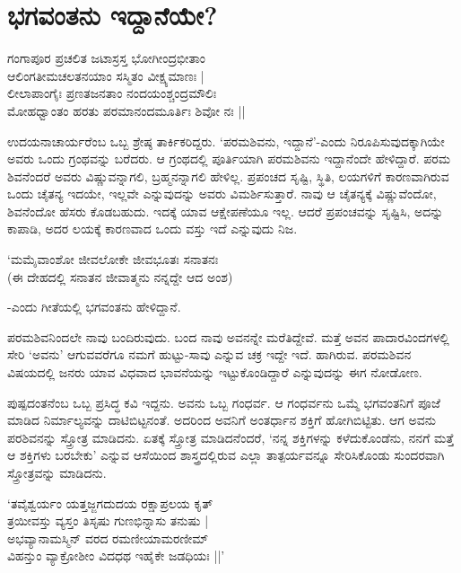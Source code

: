 \chapter{ಭಗವಂತನು ಇದ್ದಾನೆಯೇ?}\label{chap8}

\begin{shloka}
ಗಂಗಾಪೂರ ಪ್ರಚಲಿತ ಜಟಾಸ್ರಸ್ತ ಭೋಗೀಂದ್ರಭೀತಾಂ\\
ಆಲಿಂಗತೀಮಚಲತನಯಾಂ ಸಸ್ಮಿತಂ ವೀಕ್ಷ್ಯಮಾಣಃ |\\
ಲೀಲಾಪಾಂಗೈಃ ಪ್ರಣತಜನತಾಂ ನಂದಯಂಶ್ಚಂದ್ರಮೌಲಿಃ\\
ಮೋಹಧ್ವಾಂತಂ ಹರತು ಪರಮಾನಂದಮೂರ್ತಿಃ ಶಿವೋ ನಃ‌ ||
\end{shloka}

ಉದಯನಾಚಾರ್ಯರೆಂಬ ಒಬ್ಬ ಶ್ರೇಷ್ಠ ತಾರ್ಕಿಕರಿದ್ದರು. `ಪರಮಶಿವನು, ಇದ್ದಾನೆ'-ಎಂದು ನಿರೂಪಿಸುವುದಕ್ಕಾಗಿಯೇ ಅವರು ಒಂದು ಗ್ರಂಥವನ್ನು ಬರೆದರು. ಆ ಗ್ರಂಥದಲ್ಲಿ ಪೂರ್ತಿಯಾಗಿ ಪರಮಶಿವನು ಇದ್ದಾನೆಂದೇ ಹೇಳಿದ್ದಾರೆ. ಪರಮ ಶಿವನೆಂದರೆ ಅವರು ವಿಷ್ಣುವನ್ನಾಗಲಿ, ಬ್ರಹ್ಮನನ್ನಾಗಲಿ ಹೇಳಿಲ್ಲ. ಪ್ರಪಂಚದ ಸೃಷ್ಟಿ, ಸ್ಥಿತಿ, ಲಯಗಳಿಗೆ ಕಾರಣವಾಗಿರುವ ಒಂದು ಚೈತನ್ಯ ಇದಯೇ, ಇಲ್ಲವೇ ಎನ್ನುವುದನ್ನು ಅವರು ವಿಮರ್ಶಿಸುತ್ತಾರೆ. ನಾವು ಆ ಚೈತನ್ಯಕ್ಕೆ ವಿಷ್ಣುವೆಂದೋ, ಶಿವನೆಂದೋ ಹೆಸರು ಕೊಡಬಹುದು. ಇದಕ್ಕೆ ಯಾವ ಆಕ್ಷೇಪಣೆಯೂ ಇಲ್ಲ. ಆದರೆ ಪ್ರಪಂಚವನ್ನು ಸೃಷ್ಟಿಸಿ, ಅದನ್ನು ಕಾಪಾಡಿ, ಅದರ ಲಯಕ್ಕೆ ಕಾರಣವಾದ ಒಂದು ವಸ್ತು ಇದೆ ಎನ್ನುವುದು ನಿಜ.

\begin{shloka}
`ಮಮೈವಾಂಶೋ ಜೀವಲೋಕೇ ಜೀವಭೂತಃ ಸನಾತನಃ\\
(ಈ ದೇಹದಲ್ಲಿ ಸನಾತನ ಜೀವಾತ್ಮನು ನನ್ನದ್ದೇ ಆದ ಅಂಶ)
\end{shloka}

-ಎಂದು ಗೀತೆಯಲ್ಲಿ ಭಗವಂತನು ಹೇಳಿದ್ದಾನೆ.

ಪರಮಶಿವನಿಂದಲೇ ನಾವು ಬಂದಿರುವುದು. ಬಂದ ನಾವು ಅವನನ್ನೇ ಮರೆತಿದ್ದೇವೆ. ಮತ್ತೆ ಅವನ ಪಾದಾರವಿಂದಗಳಲ್ಲಿ ಸೇರಿ `ಅವನು' ಆಗುವವರೆಗೂ ನಮಗೆ ಹುಟ್ಟು-ಸಾವು ಎನ್ನುವ ಚಕ್ರ ಇದ್ದೇ ಇದೆ. ಹಾಗಿರುವ. ಪರಮಶಿವನ ವಿಷಯದಲ್ಲಿ ಜನರು ಯಾವ ವಿಧವಾದ ಭಾವನೆಯನ್ನು ಇಟ್ಟುಕೊಂಡಿದ್ದಾರೆ ಎನ್ನುವುದನ್ನು ಈಗ ನೋಡೋಣ.

ಪುಷ್ಪದಂತನೆಂಬ ಒಬ್ಬ ಪ್ರಸಿದ್ಧ ಕವಿ ಇದ್ದನು. ಅವನು ಒಬ್ಬ ಗಂಧರ್ವ. ಆ ಗಂಧರ್ವನು ಒಮ್ಮೆ ಭಗವಂತನಿಗೆ ಪೂಜೆ ಮಾಡಿದ ನಿರ್ಮಾಲ್ಯವನ್ನು ದಾಟಿಬಿಟ್ಟನಂತೆ. ಅದರಿಂದ ಅವನಿಗೆ ಅಂತರ್ಧಾನ ಶಕ್ತಿಗೆ ಹೋಗಿಬಿಟ್ಟಿತು. ಆಗ ಅವನು ಪರಶಿವನನ್ನು ಸ್ತ್ರೋತ್ರ ಮಾಡಿದನು. ಏತಕ್ಕೆ ಸ್ತ್ರೋತ್ರ ಮಾಡಿದನೆಂದರೆ, `ನನ್ನ ಶಕ್ತಿಗಳನ್ನು ಕಳೆದುಕೊಂಡೆನು, ನನಗೆ ಮತ್ತೆ ಆ ಶಕ್ತಿಗಳು ಬರಬೇಕು' ಎನ್ನುವ ಆಸೆಯಿಂದ ಶಾಸ್ತ್ರದಲ್ಲಿರುವ ಎಲ್ಲಾ ತಾತ್ಪರ್ಯವನ್ನೂ ಸೇರಿಸಿಕೊಂಡು ಸುಂದರವಾಗಿ ಸ್ತ್ರೋತ್ರವನ್ನು ಮಾಡಿದನು.

\begin{shloka}
`ತವೈಶ್ವರ್ಯಂ ಯತ್ತಜ್ಜಗದುದಯ ರಕ್ಷಾಪ್ರಲಯ ಕೃತ್\\
ತ್ರಯೀವಸ್ತು ವ್ಯಸ್ತಂ ತಿಸೃಷು ಗುಣಭಿನ್ನಾಸು ತನುಷು |\\
ಅಭವ್ಯಾನಾಮಸ್ಮಿನ್ ವರದ ರಮಣೀಯಾಮರಣೀಮ್\\
ವಿಹನ್ತುಂ ವ್ಯಾಕ್ರೋಶೀಂ ವಿದಧಥ ಇಹೈಕೇ ಜಡಧಿಯಃ ||'
\end{shloka}

